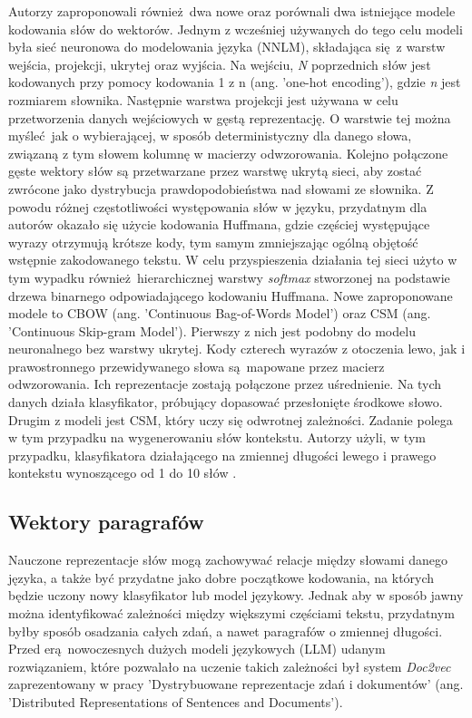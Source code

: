 Autorzy zaproponowali również dwa nowe oraz porównali dwa istniejące modele kodowania słów do wektorów. Jednym z wcześniej używanych do tego celu modeli była sieć neuronowa do modelowania języka (NNLM), składająca się z warstw wejścia, projekcji, ukrytej oraz wyjścia. Na wejściu, \emph{N} poprzednich słów jest kodowanych przy pomocy kodowania 1 z n (ang. 'one-hot encoding'), gdzie \emph{n} jest rozmiarem słownika. Następnie warstwa projekcji jest używana w celu przetworzenia danych wejściowych w gęstą reprezentację. O warstwie tej można myśleć jak o wybierającej, w sposób deterministyczny dla danego słowa, związaną z tym słowem kolumnę w macierzy odwzorowania. Kolejno połączone gęste wektory słów są przetwarzane przez warstwę ukrytą sieci, aby zostać zwrócone jako dystrybucja prawdopodobieństwa nad słowami ze słownika. Z powodu różnej częstotliwości występowania słów w języku, przydatnym dla autorów okazało się użycie kodowania Huffmana, gdzie częściej występujące wyrazy otrzymują krótsze kody, tym samym zmniejszając ogólną objętość wstępnie zakodowanego tekstu. W celu przyspieszenia działania tej sieci użyto w tym wypadku również hierarchicznej warstwy \emph{softmax} stworzonej na podstawie drzewa binarnego odpowiadającego kodowaniu Huffmana. Nowe zaproponowane modele to CBOW (ang. 'Continuous Bag-of-Words Model') oraz CSM (ang. 'Continuous Skip-gram Model'). Pierwszy z nich jest podobny do modelu neuronalnego bez warstwy ukrytej. Kody czterech wyrazów z otoczenia lewo, jak i prawostronnego przewidywanego słowa są mapowane przez macierz odwzorowania. Ich reprezentacje zostają połączone przez uśrednienie. Na tych danych działa klasyfikator, próbujący dopasować przesłonięte środkowe słowo. Drugim z modeli jest CSM, który uczy się odwrotnej zależności. Zadanie polega w tym przypadku na wygenerowaniu słów kontekstu. Autorzy użyli, w tym przypadku, klasyfikatora działającego na zmiennej długości lewego i prawego kontekstu wynoszącego od 1 do 10 słów \autocite{mikolov2013efficient}.

\subsection{Wektory paragrafów}

Nauczone reprezentacje słów mogą zachowywać relacje między słowami danego języka, a także być przydatne jako dobre początkowe kodowania, na których będzie uczony nowy klasyfikator lub model językowy. Jednak aby w sposób jawny można identyfikować zależności między większymi częściami tekstu, przydatnym byłby sposób osadzania całych zdań, a nawet paragrafów o zmiennej długości. Przed erą nowoczesnych dużych modeli językowych (LLM) udanym rozwiązaniem, które pozwalało na uczenie takich zależności był system \emph{Doc2vec} zaprezentowany w pracy 'Dystrybuowane reprezentacje zdań i dokumentów' (ang. 'Distributed Representations of Sentences and Documents').\newline

